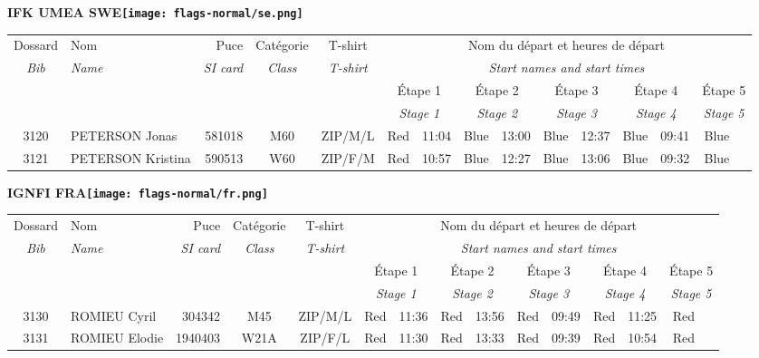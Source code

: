 \documentclass{report}
\begin{document}
\newpage
  \Huge \centering \bfseries IFK UMEA  SWE\normalfont \footnotesize \sffamily \hfill \texttt{[image: flags-normal/se.png]} \newline 
  \begin{longtable}{|c|l|r|c|c|*{5}{cc|}}
    Dossard & Nom  & Puce    & Catégorie & T-shirt & \multicolumn{10}{c|}{Nom du départ et heures de départ} \\
    \itshape Bib     & \itshape Name & \itshape SI card & \itshape Class  & \itshape  T-shirt  & \multicolumn{10}{c|}{\itshape Start names and start times} \\
    \hline
    & & & & & \multicolumn{2}{c|}{Étape 1} & \multicolumn{2}{c|}{Étape 2} & \multicolumn{2}{c|}{Étape 3} & \multicolumn{2}{c|}{Étape 4} & \multicolumn{2}{c|}{Étape 5} \\
    & & & & & \multicolumn{2}{c|}{\itshape Stage 1} & \multicolumn{2}{c|}{\itshape Stage 2} & \multicolumn{2}{c|}{\itshape Stage 3} & \multicolumn{2}{c|}{\itshape Stage 4} & \multicolumn{2}{c|}{\itshape Stage 5} \\
    \hline
    3120 & PETERSON Jonas & 581018 & M60 & ZIP/M/L & Red & 11:04 & Blue & 13:00 & Blue & 12:37 & Blue & 09:41 & Blue &  \\
    3121 & PETERSON Kristina & 590513 & W60 & ZIP/F/M & Red & 10:57 & Blue & 12:27 & Blue & 13:06 & Blue & 09:32 & Blue &  \\
  \end{longtable}
\newpage
  \Huge \centering \bfseries IGNFI  FRA\normalfont \footnotesize \sffamily \hfill \texttt{[image: flags-normal/fr.png]} \newline 
  \begin{longtable}{|c|l|r|c|c|*{5}{cc|}}
    Dossard & Nom  & Puce    & Catégorie & T-shirt & \multicolumn{10}{c|}{Nom du départ et heures de départ} \\
    \itshape Bib     & \itshape Name & \itshape SI card & \itshape Class  & \itshape  T-shirt  & \multicolumn{10}{c|}{\itshape Start names and start times} \\
    \hline
    & & & & & \multicolumn{2}{c|}{Étape 1} & \multicolumn{2}{c|}{Étape 2} & \multicolumn{2}{c|}{Étape 3} & \multicolumn{2}{c|}{Étape 4} & \multicolumn{2}{c|}{Étape 5} \\
    & & & & & \multicolumn{2}{c|}{\itshape Stage 1} & \multicolumn{2}{c|}{\itshape Stage 2} & \multicolumn{2}{c|}{\itshape Stage 3} & \multicolumn{2}{c|}{\itshape Stage 4} & \multicolumn{2}{c|}{\itshape Stage 5} \\
    \hline
    3130 & ROMIEU Cyril & 304342 & M45 & ZIP/M/L & Red & 11:36 & Red & 13:56 & Red & 09:49 & Red & 11:25 & Red &  \\
    3131 & ROMIEU Elodie & 1940403 & W21A & ZIP/F/L & Red & 11:30 & Red & 13:33 & Red & 09:39 & Red & 10:54 & Red &  \\
  \end{longtable}
\end{document}
